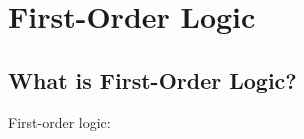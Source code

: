 \documentclass[12pt, letterpaper, oneside]{book}
\begin{document}
%
%

\chapter{First-Order Logic}

\section{What is First-Order Logic?}

First-order logic:
\end{document}
